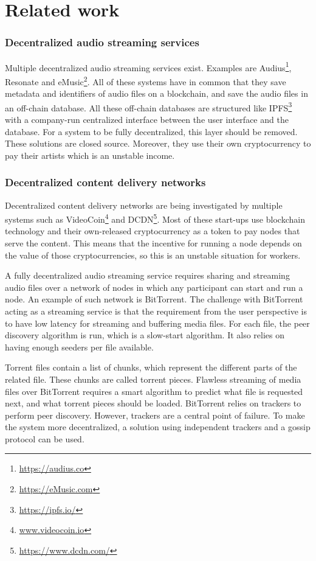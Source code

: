 \chapter{\label{chap:related-work}Related work}
\subsection{Decentralized audio streaming services}
Multiple decentralized audio streaming services exist. Examples are Audius\footnote{\url{https://audius.co}}, Resonate\cite{lindner2018investing} and eMusic\footnote{\url{https://eMusic.com}}. All of these systems have in common that they save metadata and identifiers of audio files on a blockchain, and save the audio files in an off-chain database. All these off-chain databases are structured like IPFS\footnote{\url{https://ipfs.io/}} with a company-run centralized interface between the user interface and the database. For a system to be fully decentralized, this layer should be removed. These solutions are closed source. Moreover, they use their own cryptocurrency to pay their artists which is an unstable income.

\subsection{Decentralized content delivery networks}
Decentralized content delivery networks are being investigated by multiple systems such as VideoCoin\footnote{\url{www.videocoin.io}} and DCDN\footnote{\url{https://www.dcdn.com/}}. Most of these start-ups use blockchain technology and their own-released cryptocurrency as a token to pay nodes that serve the content. This means that the incentive for running a node depends on the value of those cryptocurrencies, so this is an unstable situation for workers. 

A fully decentralized audio streaming service requires sharing and streaming audio files over a network of nodes in which any participant can start and run a node. An example of such network is BitTorrent. The challenge with BitTorrent acting as a streaming service is that the requirement from the user perspective is to have low latency for streaming and buffering media files. For each file, the peer discovery algorithm is run, which is a slow-start algorithm. It also relies on having enough seeders per file available.

Torrent files contain a list of chunks, which represent the different parts of the related file. These chunks are called torrent pieces. Flawless streaming of media files over BitTorrent requires a smart algorithm to predict what file is requested next, and what torrent pieces should be loaded. BitTorrent relies on trackers to perform peer discovery. However, trackers are a central point of failure. To make the system more decentralized, a solution using independent trackers and a gossip protocol\cite{dan2011efficient} can be used. 

